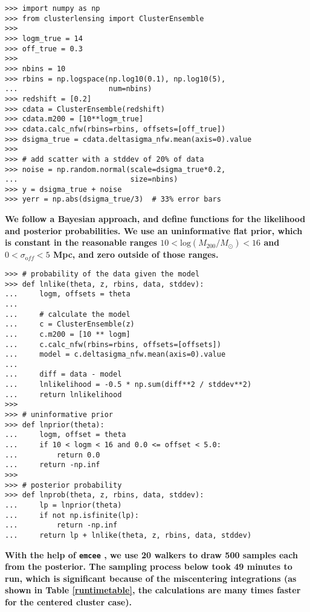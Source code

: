\documentclass[twocolumn]{aastex6}
\newcommand{\code}{\lstinline[style=codeintext]}
\begin{document}
\begin{verbatim}
>>> import numpy as np
>>> from clusterlensing import ClusterEnsemble
>>> 
>>> logm_true = 14
>>> off_true = 0.3
>>> 
>>> nbins = 10
>>> rbins = np.logspace(np.log10(0.1), np.log10(5), 
...                     num=nbins)
>>> redshift = [0.2]
>>> cdata = ClusterEnsemble(redshift)
>>> cdata.m200 = [10**logm_true]
>>> cdata.calc_nfw(rbins=rbins, offsets=[off_true])
>>> dsigma_true = cdata.deltasigma_nfw.mean(axis=0).value
>>> 
>>> # add scatter with a stddev of 20% of data
>>> noise = np.random.normal(scale=dsigma_true*0.2, 
...                          size=nbins)
>>> y = dsigma_true + noise
>>> yerr = np.abs(dsigma_true/3)  # 33% error bars
\end{verbatim}

{\bf We follow a Bayesian approach, and define functions for the likelihood and posterior probabilities. We use an uninformative flat prior, which is constant in the reasonable ranges $10 < \mathrm{log}(M_{200}/M_{\odot}) < 16$ and $0 < \sigma_{\mathrm off} < 5$ Mpc, and zero outside of those ranges.}

\pagebreak

\begin{verbatim}
>>> # probability of the data given the model
>>> def lnlike(theta, z, rbins, data, stddev):
...     logm, offsets = theta
...     
...     # calculate the model
...     c = ClusterEnsemble(z)
...     c.m200 = [10 ** logm]
...     c.calc_nfw(rbins=rbins, offsets=[offsets])
...     model = c.deltasigma_nfw.mean(axis=0).value
...     
...     diff = data - model
...     lnlikelihood = -0.5 * np.sum(diff**2 / stddev**2)
...     return lnlikelihood
>>>
>>> # uninformative prior
>>> def lnprior(theta):
...     logm, offset = theta
...     if 10 < logm < 16 and 0.0 <= offset < 5.0:
...         return 0.0
...     return -np.inf
>>>
>>> # posterior probability
>>> def lnprob(theta, z, rbins, data, stddev):
...     lp = lnprior(theta)
...     if not np.isfinite(lp):
...         return -np.inf
...     return lp + lnlike(theta, z, rbins, data, stddev)
\end{verbatim}

{\bf With the help of \code{emcee} \citep{emcee}, we use 20 walkers to draw 500 samples each from the posterior. The sampling process below took 49 minutes to run, which is significant because of the miscentering integrations (as shown in Table \ref{runtimetable}, the calculations are many times faster for the centered cluster case).}
\end{document}
